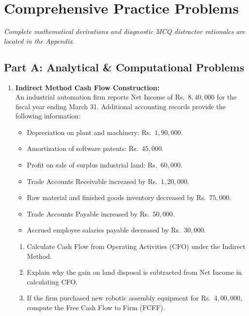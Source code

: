 \section{Comprehensive Practice Problems}
\textit{Complete mathematical derivations and diagnostic MCQ distractor rationales are located in the Appendix.}

\subsection*{Part A: Analytical \& Computational Problems}

\begin{enumerate}[label=\textbf{P3.\arabic*}]
    \item \textbf{Indirect Method Cash Flow Construction:}\\
    An industrial automation firm reports Net Income of Rs.~$8{,}40{,}000$ for the fiscal year ending March 31. Additional accounting records provide the following information:
    \begin{itemize}
        \item Depreciation on plant and machinery: Rs.~$1{,}90{,}000$.
        \item Amortization of software patents: Rs.~$45{,}000$.
        \item Profit on sale of surplus industrial land: Rs.~$60{,}000$.
        \item Trade Accounts Receivable increased by Rs.~$1{,}20{,}000$.
        \item Raw material and finished goods inventory decreased by Rs.~$75{,}000$.
        \item Trade Accounts Payable increased by Rs.~$50{,}000$.
        \item Accrued employee salaries payable decreased by Rs.~$30{,}000$.
    \end{itemize}
    \begin{enumerate}[label=(\alph*)]
        \item Calculate Cash Flow from Operating Activities (CFO) under the Indirect Method.
        \item Explain why the gain on land disposal is subtracted from Net Income in calculating CFO.
        \item If the firm purchased new robotic assembly equipment for Rs.~$4{,}00{,}000$, compute the Free Cash Flow to Firm (FCFF).
    \end{enumerate}


\end{enumerate}
